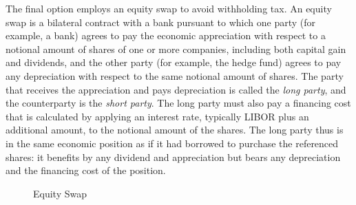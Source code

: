 The final option employs an equity swap to avoid withholding tax.  An equity swap is a bilateral contract with a bank pursuant to which one party (for example, a bank) agrees to pay the economic appreciation with respect to a notional amount of shares of one or more companies, including both capital gain and dividends, and the other party (for example, the hedge fund) agrees to pay any depreciation with respect to the same notional amount of shares.  The party that receives the appreciation and pays depreciation is called the \emph{long party}, and the counterparty is the \emph{short party}.  The long party must also pay a financing cost that is calculated by applying an interest rate, typically LIBOR plus an additional amount, to the notional amount of the shares.  The long party thus is in the same economic position as if it had borrowed to purchase the referenced shares: it benefits by any dividend and appreciation but bears any depreciation and the financing cost of the position.

\begin{figure}[hbtp]
\caption{Equity Swap}
\begin{center}
\setlength\fboxsep{0pt}
\setlength\fboxrule{0.5pt}
\end{center}
\label{your-reference-key}
\end{figure}

